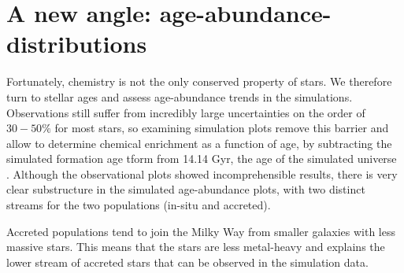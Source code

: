 \documentclass[fleqn,usenatbib]{mnras}
\begin{document}
\section{A new angle: age-abundance-distributions}

Fortunately, chemistry is not the only conserved property of stars. We therefore turn to stellar ages and assess age-abundance trends in the simulations. Observations still suffer from incredibly large uncertainties on the order of $30-50\%$ for most stars, so examining simulation plots remove this barrier and allow to determine chemical enrichment as a function of age, by subtracting the simulated formation age tform from 14.14 Gyr, the age of the simulated universe \citep{Buck2021}. Although the observational plots showed incomprehensible results, there is very clear substructure in the simulated age-abundance plots, with two distinct streams for the two populations (in-situ and accreted).\par 

Accreted populations tend to join the Milky Way from smaller galaxies with less massive stars. This means that the stars are less metal-heavy and explains the lower stream of accreted stars that can be observed in the simulation data. \par 
\end{document}
